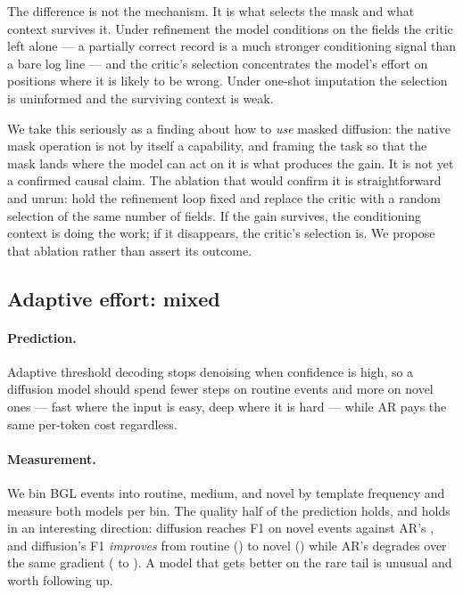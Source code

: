 The difference is not the mechanism. It is what selects the mask and what
context survives it. Under refinement the model conditions on the fields the
critic left alone --- a partially correct record is a much stronger conditioning
signal than a bare log line --- and the critic's selection concentrates the
model's effort on positions where it is likely to be wrong. Under one-shot
imputation the selection is uninformed and the surviving context is weak.

We take this seriously as a finding about how to \emph{use} masked diffusion:
the native mask operation is not by itself a capability, and framing the task so
that the mask lands where the model can act on it is what produces the gain.
It is not yet a confirmed causal claim. The ablation that would confirm it is
straightforward and unrun: hold the refinement loop fixed and replace the critic
with a random selection of the same number of fields. If the gain survives, the
conditioning context is doing the work; if it disappears, the critic's selection
is. We propose that ablation rather than assert its outcome.

\subsection{Adaptive effort: mixed}
\label{sec:neg-adaptive}

\paragraph{Prediction.} Adaptive threshold decoding stops denoising when
confidence is high, so a diffusion model should spend fewer steps on routine
events and more on novel ones --- fast where the input is easy, deep where it is
hard --- while AR pays the same per-token cost regardless.

\paragraph{Measurement.} We bin BGL events into routine, medium, and novel by
template frequency and measure both models per bin. The quality half of the
prediction holds, and holds in an interesting direction: diffusion reaches
\adaptDMNovel{} F1 on novel events against AR's \adaptARNovel, and diffusion's
F1 \emph{improves} from routine () to novel
(\adaptDMNovel) while AR's degrades over the same gradient
( to \adaptARNovel). A model that gets better on the
rare tail is unusual and worth following up.

